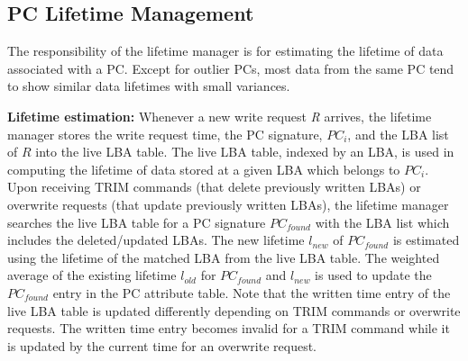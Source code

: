 

\vspace{-10pt}
\subsection{PC Lifetime Management}
\vspace{-5pt}
The responsibility of the lifetime manager is for estimating the lifetime of
data associated with a PC. 
Except for outlier PCs, most data from the same PC tend to show similar 
data lifetimes with small variances.

\textbf{Lifetime estimation:}
Whenever a new write request {\it R} arrives, 
the lifetime manager stores the write request time,
the PC signature, $PC_i$, and the LBA list of {$R$} into the live LBA table.
The live LBA table, indexed by an LBA, is used in computing the lifetime of data stored
at a given LBA which belongs to $PC_i$.
Upon receiving TRIM commands (that delete previously written LBAs)
or overwrite requests (that update previously
written LBAs), the lifetime manager searches the live LBA table for a PC
signature $PC_{found}$ with the LBA list which includes the deleted/updated LBAs.
The new lifetime $l_{new}$ of $PC_{found}$ is estimated using the lifetime 
of the matched LBA from the live LBA table. The weighted average of the existing
lifetime $l_{old}$ for $PC_{found}$ and $l_{new}$ is used to update the $PC_{found}$
entry in the PC attribute table.
Note that the written time entry of the live LBA table is updated differently 
depending on TRIM commands or overwrite requests.
The written time entry becomes invalid for a TRIM command while it is updated by 
the current time for an overwrite request.

